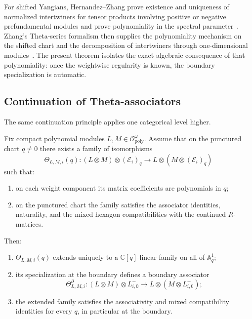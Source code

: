 \begin{remark}
\label{rem:why-R-matrix-hypotheses-are-natural}
For shifted Yangians, Hernandez--Zhang prove existence and uniqueness of
normalized intertwiners for tensor products involving positive or negative
prefundamental modules and prove polynomiality in the spectral
parameter~\cite{HZ24}. Zhang's Theta-series formalism then supplies the
polynomiality mechanism on the shifted chart and the decomposition of
intertwiners through one-dimensional modules~\cite{ZhangTheta24}. The
present theorem isolates the exact algebraic consequence of that
polynomiality: once the weightwise regularity is known, the boundary
specialization is automatic.
\end{remark}

\subsection{Continuation of Theta-associators}

The same continuation principle applies one categorical level higher.

\begin{theorem}
\ClaimStatusProvedHere
\label{thm:continuation-of-theta-associators}
Fix compact polynomial modules $L,M\in \mathcal O^{\omega}_{\mathrm{poly}}$.
Assume that on the punctured chart $q\neq 0$ there exists a family of
isomorphisms
\begin{equation}
\Theta_{L,M,i}(q):
(L\otimes M)\otimes (\mathcal E_i)_q
\longrightarrow
L\otimes (M\otimes (\mathcal E_i)_q)
\end{equation}
such that:
\begin{enumerate}
 \item on each weight component its matrix coefficients are
 polynomials in $q$;
 \item on the punctured chart the family satisfies the associator
 identities, naturality, and the mixed hexagon compatibilities with
 the continued $R$-matrices.
\end{enumerate}
Then:
\begin{enumerate}
 \item $\Theta_{L,M,i}(q)$ extends uniquely to a $\mathbb C[q]$-linear
 family on all of $\mathbb A^1_q$;
 \item its specialization at the boundary defines a boundary
 associator
 \begin{equation}
 \Theta^{\partial}_{L,M,i}:
 (L\otimes M)\otimes L^-_{i,0}
 \longrightarrow
 L\otimes (M\otimes L^-_{i,0});
 \end{equation}
 \item the extended family satisfies the associativity and mixed
 compatibility identities for every $q$, in particular at the
 boundary.
\end{enumerate}
\end{theorem}


